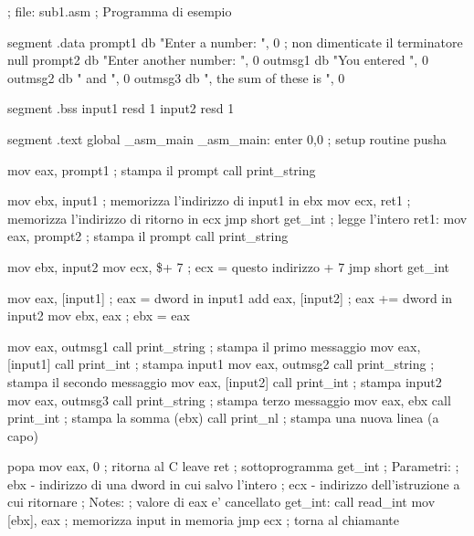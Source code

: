 \begin{AsmCodeListing}[label=sub1.asm]
; file: sub1.asm
; Programma di esempio

segment .data
prompt1 db    "Enter a number: ", 0       ; non dimenticate il terminatore null
prompt2 db    "Enter another number: ", 0
outmsg1 db    "You entered ", 0
outmsg2 db    " and ", 0
outmsg3 db    ", the sum of these is ", 0

segment .bss
input1  resd 1
input2  resd 1

segment .text
        global  _asm_main
_asm_main:
        enter   0,0               ; setup routine
        pusha

        mov     eax, prompt1      ; stampa il prompt
        call    print_string

        mov     ebx, input1       ; memorizza l'indirizzo di input1 in ebx
        mov     ecx, ret1         ; memorizza l'indirizzo di ritorno in ecx
        jmp     short get_int     ; legge l'intero
ret1:
        mov     eax, prompt2      ; stampa il prompt
        call    print_string

        mov     ebx, input2
        mov     ecx, \$+ 7        ; ecx = questo indirizzo + 7
        jmp     short get_int

        mov     eax, [input1]     ; eax = dword in input1
        add     eax, [input2]     ; eax += dword in input2
        mov     ebx, eax          ; ebx = eax

        mov     eax, outmsg1
        call    print_string      ; stampa il primo messaggio
        mov     eax, [input1]     
        call    print_int         ; stampa input1
        mov     eax, outmsg2
        call    print_string      ; stampa il secondo messaggio
        mov     eax, [input2]
        call    print_int         ; stampa input2
        mov     eax, outmsg3
        call    print_string      ; stampa terzo messaggio
        mov     eax, ebx
        call    print_int         ; stampa la somma (ebx)
        call    print_nl          ; stampa una nuova linea (a capo)

        popa
        mov     eax, 0            ; ritorna al C
        leave                     
        ret
; sottoprogramma get_int
; Parametri:
;   ebx - indirizzo di una dword in cui salvo l'intero
;   ecx - indirizzo dell'istruzione a cui ritornare
; Notes:
;   valore di eax e' cancellato
get_int:
        call    read_int
        mov     [ebx], eax         ; memorizza input in memoria
        jmp     ecx                ; torna al chiamante
\end{AsmCodeListing}

